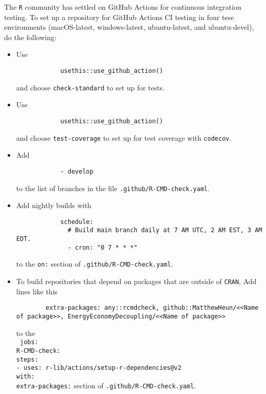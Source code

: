 \documentclass{article}
\begin{document}
The \texttt{R} community has settled on GitHub Actions for continuous integration testing.
To set up a repository for GitHub Actions CI testing in four tese environments
(macOS-latest, windows-latest, ubuntu-latest, and ubuntu-devel),
do the following:
%
\begin{itemize}

  \item Use
  		\begin{verbatim}
			usethis::use_github_action()
  	 	\end{verbatim}
		and choose \verb|check-standard| to set up for tests.

  \item Use
  		\begin{verbatim}
			usethis::use_github_action()
  	 	\end{verbatim}
		and choose \verb|test-coverage| to set up for test coverage with \verb|codecov|.

  \item Add
  		\begin{verbatim}
			- develop
		\end{verbatim}
		to the list of branches in the file \texttt{.github/R-CMD-check.yaml}.

  \item Add nightly builds with
  		\begin{verbatim}
			schedule:
			  # Build main branch daily at 7 AM UTC, 2 AM EST, 3 AM EDT.
			  - cron: "0 7 * * *"
		\end{verbatim}
	    to the \texttt{on:} section of \texttt{.github/R-CMD-check.yaml}.\

  \item To build repositories that depend on packages that are outside of \texttt{CRAN},
		Add lines like this
	    \begin{verbatim}
        extra-packages: any::rcmdcheck, github::MatthewHeun/<<Name of package>>, EnergyEconomyDecoupling/<<Name of package>>
			\end{verbatim}
		to the \\
		\texttt{
		jobs: \\
      R-CMD-check:\\
        steps:\\
          - uses: r-lib/actions/setup-r-dependencies@v2\\
            with:\\
              extra-packages:}
    section of
		\texttt{.github/R-CMD-check.yaml}.

\end{itemize}
\end{document}
